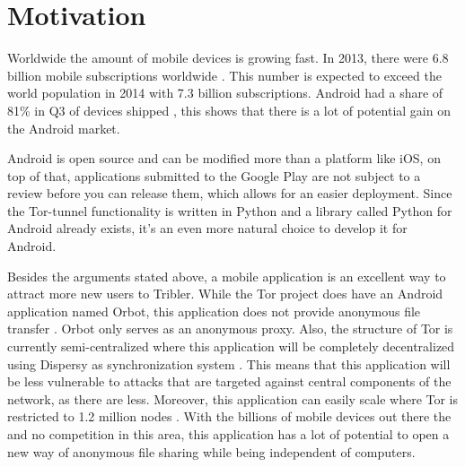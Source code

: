 \section{Motivation}
	Worldwide the amount of mobile devices is growing fast. In 2013, there were 6.8 billion mobile subscriptions worldwide \cite{itustatistics}. This number is expected to exceed the world population in 2014 with 7.3 billion subscriptions. Android had a share of 81\% in Q3 of devices shipped \cite{forbesandroidmarket}, this shows that there is a lot of potential gain on the Android market. 
	
	Android is open source and can be modified more than a platform like iOS, on top of that, applications submitted to the Google Play are not subject to a review before you can release them, which allows for an easier deployment. Since the Tor-tunnel functionality is written in Python and a library called Python for Android already exists, it's an even more natural choice to develop it for Android.

	Besides the arguments stated above, a mobile application is an excellent way to attract more new users to Tribler. While the Tor project does have an Android application named Orbot, this application does not provide anonymous file transfer \cite{tororbot, googleplayorbot}. Orbot only serves as an anonymous proxy. Also, the structure of Tor is currently semi-centralized \cite{jagerman2014fifteen} where this application will be completely decentralized using Dispersy as synchronization system \cite{zeilemaker2013dispersy}. This means that this application will be less vulnerable to attacks that are targeted against central components of the network, as there are less. Moreover, this application can easily scale where Tor is restricted to 1.2 million nodes \cite{mclachlan2009scalable}. With the billions of mobile devices out there the and no competition in this area, this application has a lot of potential to open a new way of anonymous file sharing while being independent of computers.
	
